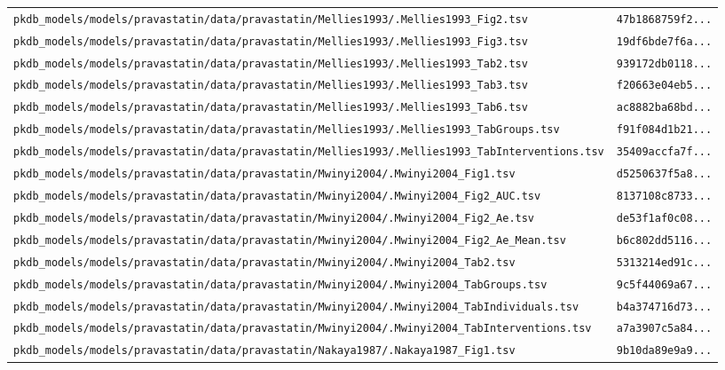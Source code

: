 \begin{longtable}{ll}
\texttt{pkdb\_models/models/pravastatin/data/pravastatin/Mellies1993/.Mellies1993\_Fig2.tsv} & \texttt{47b1868759f2...} \\
\texttt{pkdb\_models/models/pravastatin/data/pravastatin/Mellies1993/.Mellies1993\_Fig3.tsv} & \texttt{19df6bde7f6a...} \\
\texttt{pkdb\_models/models/pravastatin/data/pravastatin/Mellies1993/.Mellies1993\_Tab2.tsv} & \texttt{939172db0118...} \\
\texttt{pkdb\_models/models/pravastatin/data/pravastatin/Mellies1993/.Mellies1993\_Tab3.tsv} & \texttt{f20663e04eb5...} \\
\texttt{pkdb\_models/models/pravastatin/data/pravastatin/Mellies1993/.Mellies1993\_Tab6.tsv} & \texttt{ac8882ba68bd...} \\
\texttt{pkdb\_models/models/pravastatin/data/pravastatin/Mellies1993/.Mellies1993\_TabGroups.tsv} & \texttt{f91f084d1b21...} \\
\texttt{pkdb\_models/models/pravastatin/data/pravastatin/Mellies1993/.Mellies1993\_TabInterventions.tsv} & \texttt{35409accfa7f...} \\
\texttt{pkdb\_models/models/pravastatin/data/pravastatin/Mwinyi2004/.Mwinyi2004\_Fig1.tsv} & \texttt{d5250637f5a8...} \\
\texttt{pkdb\_models/models/pravastatin/data/pravastatin/Mwinyi2004/.Mwinyi2004\_Fig2\_AUC.tsv} & \texttt{8137108c8733...} \\
\texttt{pkdb\_models/models/pravastatin/data/pravastatin/Mwinyi2004/.Mwinyi2004\_Fig2\_Ae.tsv} & \texttt{de53f1af0c08...} \\
\texttt{pkdb\_models/models/pravastatin/data/pravastatin/Mwinyi2004/.Mwinyi2004\_Fig2\_Ae\_Mean.tsv} & \texttt{b6c802dd5116...} \\
\texttt{pkdb\_models/models/pravastatin/data/pravastatin/Mwinyi2004/.Mwinyi2004\_Tab2.tsv} & \texttt{5313214ed91c...} \\
\texttt{pkdb\_models/models/pravastatin/data/pravastatin/Mwinyi2004/.Mwinyi2004\_TabGroups.tsv} & \texttt{9c5f44069a67...} \\
\texttt{pkdb\_models/models/pravastatin/data/pravastatin/Mwinyi2004/.Mwinyi2004\_TabIndividuals.tsv} & \texttt{b4a374716d73...} \\
\texttt{pkdb\_models/models/pravastatin/data/pravastatin/Mwinyi2004/.Mwinyi2004\_TabInterventions.tsv} & \texttt{a7a3907c5a84...} \\
\texttt{pkdb\_models/models/pravastatin/data/pravastatin/Nakaya1987/.Nakaya1987\_Fig1.tsv} & \texttt{9b10da89e9a9...} \\

\end{longtable}
